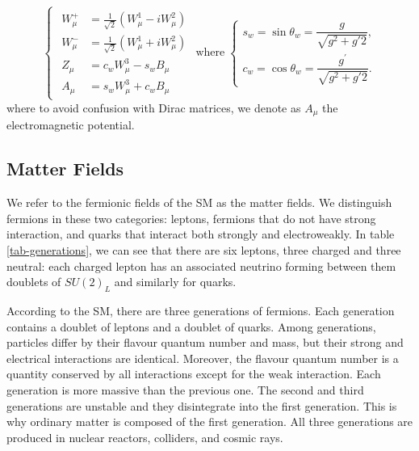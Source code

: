 \begin{equation}
\begin{cases}
	\begin{aligned}
		W_{\mu}^{+} &=\frac{1}{\sqrt{2}}\left(W_{\mu}^{1}-i W_{\mu}^{2}\right) \\
		W_{\mu}^{-} &=\frac{1}{\sqrt{2}}\left(W_{\mu}^{1}+i W_{\mu}^{2}\right) \\
		Z_{\mu} &=c_{w} W_{\mu}^{3}-s_{w} B_{\mu} \\
		A_{\mu} &=s_{w} W_{\mu}^{3}+c_{w} B_{\mu}
	\end{aligned}
\end{cases}
\text{where}
\;
\begin{cases}
	s_{w}=\sin \theta_{w}=\dfrac{g}{\sqrt{g^{2}+g{\prime2}}},\\
	c_{w}=\cos \theta_{w}=\dfrac{g^\prime}{\sqrt{g^{2}+g{\prime2}}}.
\end{cases}
\end{equation}
where to avoid confusion with Dirac matrices, we denote as $A_\mu$ the electromagnetic potential.
\subsection{Matter Fields}
We refer to the fermionic fields of the SM as the matter fields. We distinguish fermions in these two categories: leptons, fermions that do not have strong interaction, and quarks that interact both strongly and electroweakly. In table \ref{tab-generations}, we can see that there are six leptons, three charged and three neutral: each charged lepton has an associated neutrino forming between them doublets of $SU(2)_L$ and similarly for quarks. 

According to the SM, there are three generations of fermions. Each generation contains a doublet of leptons and a doublet of quarks. Among generations, particles differ by their flavour quantum number and mass, but their strong and electrical interactions are identical. Moreover, the flavour quantum number is a quantity conserved by all interactions except for the weak interaction.  Each generation is more massive than the previous one. The second and third generations are unstable and they disintegrate into the first generation. This is why ordinary matter is composed of the first generation. All three generations are produced in nuclear reactors, colliders, and cosmic rays. 

